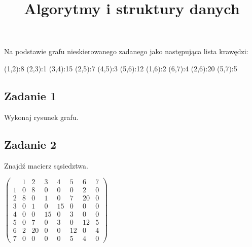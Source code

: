 \documentclass{article}
\begin{document}
\title{Algorytmy i struktury danych}
\author{}
\date{}
\maketitle

Na podstawie grafu nieskierowanego zadanego jako następująca lista krawędzi:
\begin{center}
    (1,2):8 (2,3):1 (3,4):15 (2,5):7 (4,5):3 (5,6):12 (1,6):2 (6,7):4 (2,6):20 (5,7):5
\end{center}

\subsection*{Zadanie 1}
Wykonaj rysunek grafu.
\begin{center}
\end{center}

\subsection*{Zadanie 2}
Znajdź macierz sąsiedztwa.
\begin{center}$
        \begin{pmatrix}
              & 1 & 2  & 3  & 4  & 5  & 6  & 7 \\
            1 & 0 & 8  & 0  & 0  & 0  & 2  & 0 \\
            2 & 8 & 0  & 1  & 0  & 7  & 20 & 0 \\
            3 & 0 & 1  & 0  & 15 & 0  & 0  & 0 \\
            4 & 0 & 0  & 15 & 0  & 3  & 0  & 0 \\
            5 & 0 & 7  & 0  & 3  & 0  & 12 & 5 \\
            6 & 2 & 20 & 0  & 0  & 12 & 0  & 4 \\
            7 & 0 & 0  & 0  & 0  & 5  & 4  & 0
        \end{pmatrix}$
\end{center}
\end{document}
